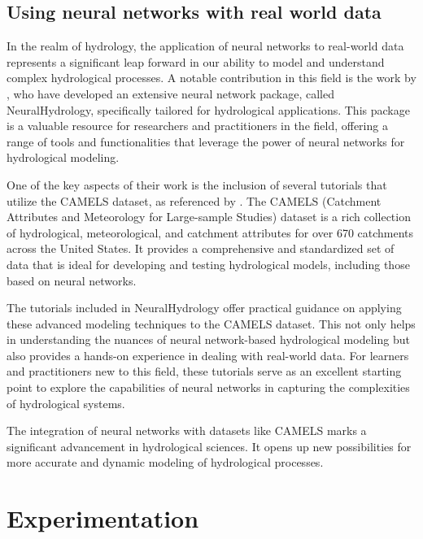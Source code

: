 \documentclass{article}
\begin{document}
\subsection{Using neural networks with real world data}
\label{methods:real_world}
In the realm of hydrology, the application of neural networks to real-world data represents a significant leap forward in our ability to model and understand complex hydrological processes. A notable contribution in this field is the work by \cite{Kratzert2022open}, who have developed an extensive neural network package, called NeuralHydrology, specifically tailored for hydrological applications. This package is a valuable resource for researchers and practitioners in the field, offering a range of tools and functionalities that leverage the power of neural networks for hydrological modeling.

One of the key aspects of their work is the inclusion of several tutorials that utilize the CAMELS dataset, as referenced by \citep{Addor2017}. The CAMELS (Catchment Attributes and Meteorology for Large-sample Studies) dataset is a rich collection of hydrological, meteorological, and catchment attributes for over 670 catchments across the United States. It provides a comprehensive and standardized set of data that is ideal for developing and testing hydrological models, including those based on neural networks.

The tutorials included in NeuralHydrology offer practical guidance on applying these advanced modeling techniques to the CAMELS dataset. This not only helps in understanding the nuances of neural network-based hydrological modeling but also provides a hands-on experience in dealing with real-world data. For learners and practitioners new to this field, these tutorials serve as an excellent starting point to explore the capabilities of neural networks in capturing the complexities of hydrological systems.

The integration of neural networks with datasets like CAMELS marks a significant advancement in hydrological sciences. It opens up new possibilities for more accurate and dynamic modeling of hydrological processes.

\section{Experimentation}
\label{methods:experimentation}
\end{document}
